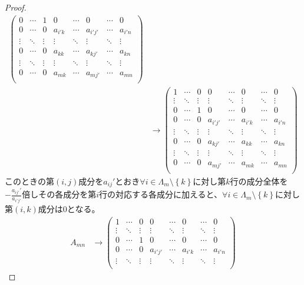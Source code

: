 \documentclass[dvipdfmx]{jsarticle}
\begin{document}
\begin{proof}
\begin{align*}
\begin{pmatrix}
0 & \cdots & 1 & 0 & \cdots & 0 & \cdots & 0 \\
0 & \cdots & 0 & a_{i'k} & \cdots & a_{i'j'} & \cdots & a_{i'n} \\
 \vdots & \ddots & \vdots & \vdots & \ddots & \vdots & \ddots & \vdots \\
0 & \cdots & 0 & a_{kk} & \cdots & a_{kj'} & \cdots & a_{kn} \\
 \vdots & \ddots & \vdots & \vdots & \ddots & \vdots & \ddots & \vdots \\
0 & \cdots & 0 & a_{mk} & \cdots & a_{mj'} & \cdots & a_{mn} \\
\end{pmatrix}\\
&\rightarrow \begin{pmatrix}
1 & \cdots & 0 & 0 & \cdots & 0 & \cdots & 0 \\
 \vdots & \ddots & \vdots & \vdots & \ddots & \vdots & \ddots & \vdots \\
0 & \cdots & 1 & 0 & \cdots & 0 & \cdots & 0 \\
0 & \cdots & 0 & a_{i'j'} & \cdots & a_{i'k} & \cdots & a_{i'n} \\
 \vdots & \ddots & \vdots & \vdots & \ddots & \vdots & \ddots & \vdots \\
0 & \cdots & 0 & a_{kj'} & \cdots & a_{kk} & \cdots & a_{kn} \\
 \vdots & \ddots & \vdots & \vdots & \ddots & \vdots & \ddots & \vdots \\
0 & \cdots & 0 & a_{mj'} & \cdots & a_{mk} & \cdots & a_{mn} \\
\end{pmatrix}
\end{align*}
このときの第$(i,j)$成分を$a_{ij}'$とおき$\forall i \in \varLambda_{m} \setminus \left\{ k \right\}$に対し第$k$行の成分全体を$- \frac{a_{ij'}'}{a_{i'j'}}$倍しその各成分を第$i$行の対応する各成分に加えると、$\forall i \in \varLambda_{m} \setminus \left\{ k \right\}$に対し第$(i,k)$成分は0となる。
\begin{align*}
A_{mn} &\rightarrow \begin{pmatrix}
1 & \cdots & 0 & 0 & \cdots & 0 & \cdots & 0 \\
 \vdots & \ddots & \vdots & \vdots & \ddots & \vdots & \ddots & \vdots \\
0 & \cdots & 1 & 0 & \cdots & 0 & \cdots & 0 \\
0 & \cdots & 0 & a_{i'j'} & \cdots & a_{i'k} & \cdots & a_{i'n} \\
 \vdots & \ddots & \vdots & \vdots & \ddots & \vdots & \ddots & \vdots \\

\end{pmatrix}
\end{align*}
\end{proof}
\end{document}

